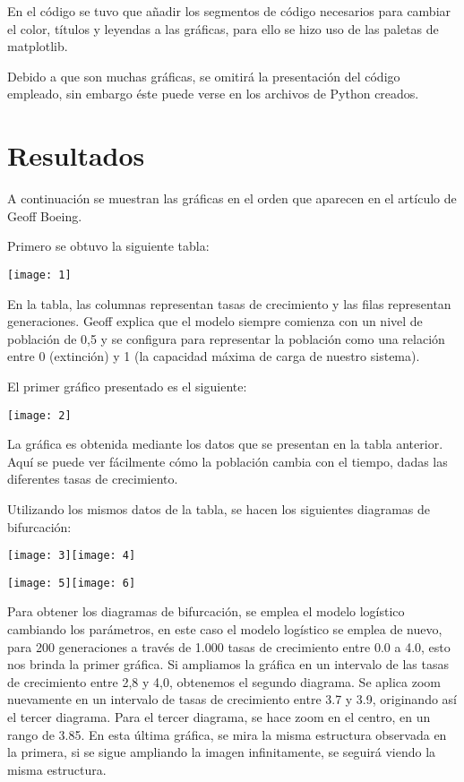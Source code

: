 \documentclass[12pt]{article}
\begin{document}
\begin{doublespace}
En el código se tuvo que añadir los segmentos de código necesarios para cambiar el color, títulos y leyendas a las gráficas, para ello se hizo uso de las paletas de matplotlib. 

Debido a que son muchas gráficas, se omitirá la presentación del código empleado, sin embargo éste puede verse en los archivos de Python creados.

\section{Resultados}

A continuación se muestran las gráficas en el orden que aparecen en el artículo de Geoff Boeing.

Primero se obtuvo la siguiente tabla:

\begin{center}
\texttt{[image: 1]}
\end{center}

En la tabla, las columnas representan tasas de crecimiento y las filas representan generaciones. Geoff explica que el modelo siempre comienza con un nivel de población de 0,5 y se configura para representar la población como una relación entre 0 (extinción) y 1 (la capacidad máxima de carga de nuestro sistema).

El primer gráfico presentado es el siguiente:

\begin{center}
\texttt{[image: 2]}
\end{center}

La gráfica es obtenida mediante los datos que se presentan en la tabla anterior. Aquí se puede ver fácilmente cómo la población cambia con el tiempo, dadas las diferentes tasas de crecimiento.

Utilizando los mismos datos de la tabla, se hacen los siguientes diagramas de bifurcación:
\begin{center}
\texttt{[image: 3]}\texttt{[image: 4]}

\texttt{[image: 5]}\texttt{[image: 6]}
\end{center}

Para obtener los diagramas de bifurcación, se emplea el modelo logístico cambiando los parámetros, en este caso el modelo logístico se emplea de nuevo, para 200 generaciones a través de 1.000 tasas de crecimiento entre 0.0 a 4.0, esto nos brinda la primer gráfica. Si ampliamos la gráfica en un intervalo de las tasas de crecimiento entre 2,8 y 4,0, obtenemos el segundo diagrama. Se aplica zoom nuevamente en un intervalo de tasas de crecimiento entre 3.7 y 3.9, originando así el tercer diagrama. Para el tercer diagrama, se hace zoom en el centro, en un rango de 3.85. En esta última gráfica, se mira la misma estructura observada en la primera, si se sigue ampliando la imagen infinitamente, se seguirá viendo la misma estructura.


\end{doublespace}
\end{document}
